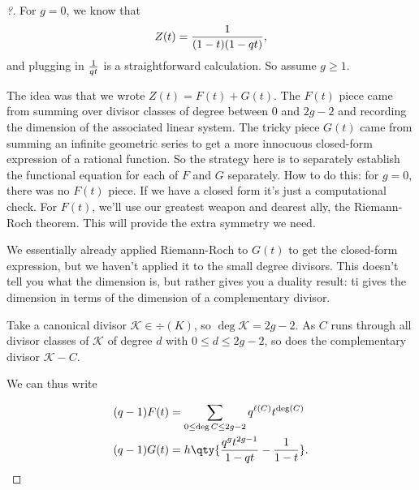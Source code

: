 \begin{proof}[?]

For \(g=0\), we know that
\begin{align*}  
Z(t) = {1 \over (1-t)(1-qt)}
,\end{align*} and plugging in \({1\over qt}\) is a straightforward
calculation. So assume \(g\geq 1\).

The idea was that we wrote \(Z(t) = F(t) + G(t)\). The \(F(t)\) piece
came from summing over divisor classes of degree between \(0\) and
\(2g-2\) and recording the dimension of the associated linear system.
The tricky piece \(G(t)\) came from summing an infinite geometric series
to get a more innocuous closed-form expression of a rational function.
So the strategy here is to separately establish the functional equation
for each of \(F\) and \(G\) separately. How to do this: for \(g=0\),
there was no \(F(t)\) piece. If we have a closed form it's just a
computational check. For \(F(t)\), we'll use our greatest weapon and
dearest ally, the Riemann-Roch theorem. This will provide the extra
symmetry we need.

We essentially already applied Riemann-Roch to \(G(t)\) to get the
closed-form expression, but we haven't applied it to the small degree
divisors. This doesn't tell you what the dimension is, but rather gives
you a duality result: ti gives the dimension in terms of the dimension
of a complementary divisor.

Take a canonical divisor \(\mathcal{K} \in \div(K)\), so
\(\deg \mathcal{K} = 2g-2\). As \(C\) runs through all divisor classes
of \(\mathcal{K}\) of degree \(d\) with \(0\leq d \leq 2g-2\), so does
the complementary divisor \(\mathcal{K}-C\).

We can thus write

\begin{align*}  
(q-1) F(t) 
&= \sum_{0 \leq \deg C \leq 2g-2 } q^{\ell(C)} t^{\deg(C)} \\
(q-1)G(t)
&= h \qty{ {q^g t^{2g-1} \over 1-qt} - {1 \over 1-t} }
.\end{align*}


\end{proof}
